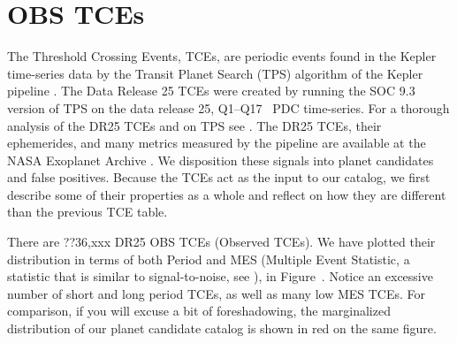 \section{OBS TCEs}
\label{tces}
The Threshold Crossing Events, TCEs, are periodic events found in the Kepler time-series data by the Transit Planet Search (TPS) algorithm of the Kepler pipeline \citep[see][]{Twicken2016, Jenkins2017, Fanelli2011}.  The Data Release 25 TCEs were created by running the SOC 9.3 version of TPS on the data release 25, Q1--Q17 \Kepler\ PDC time-series.  For a thorough analysis of the DR25 TCEs and on TPS see \citet{Twicken2016}.  The DR25 TCEs, their ephemerides, and many metrics measured by the pipeline are available at the NASA Exoplanet Archive \citet{Aekeson2013}.  We disposition these signals into planet candidates and false positives.   Because the TCEs act as the input to our catalog, we first describe some of their properties as a whole and reflect on how they are different than the previous TCE table.

There are ??36,xxx DR25 OBS TCEs (Observed TCEs).  We have plotted their distribution in terms of both Period and MES (Multiple Event Statistic, a statistic that is similar to signal-to-noise, see \citep{}), in Figure~\label{f:tces}.  Notice an excessive number of short and long period TCEs, as well as many low MES TCEs.  For comparison, if you will excuse a bit of foreshadowing, the marginalized distribution of our planet candidate catalog is shown in red on the same figure.

